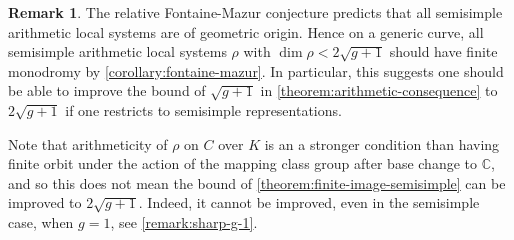\documentclass[12 pt]{amsart}
\theoremstyle{plain}
\theoremstyle{definition}
\newtheorem{remark}[subsubsection]{Remark}
\theoremstyle{remark}
\numberwithin{equation}{section}
\begin{document}
\begin{remark}\label{remark:fontaine-mazur}
	The relative Fontaine-Mazur conjecture predicts that all semisimple arithmetic  local systems
	are of geometric origin. Hence on a generic curve, all semisimple arithmetic local systems $\rho$ with $\dim \rho< 2 \sqrt{g+1}$ should  have finite monodromy by
	\autoref{corollary:fontaine-mazur}.
	In particular, this suggests one should be able to improve the bound of $\sqrt{g+1}$ in
	\autoref{theorem:arithmetic-consequence} to $2 \sqrt{g+1}$ if one
	restricts to semisimple representations.

Note that arithmeticity of $\rho$ on $C$ over $K$ is an a stronger condition than having finite orbit under
the action of the mapping class group after base change to $\mathbb C$, and so
this does not mean the bound of \autoref{theorem:finite-image-semisimple} can be improved
to $2 \sqrt{g+1}$. Indeed, it cannot be improved, even in the semisimple case, when $g = 1$, see
\autoref{remark:sharp-g-1}.
\end{remark}
\end{document}
